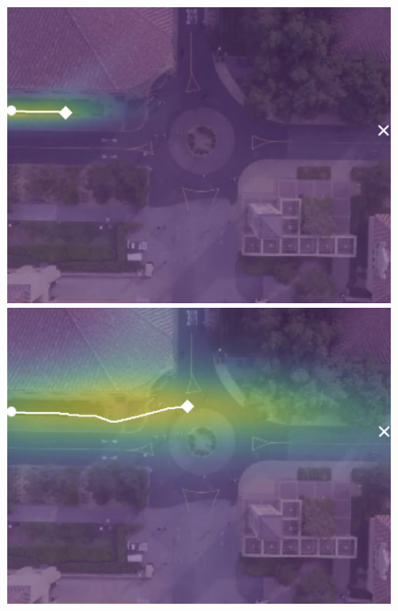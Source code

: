\documentclass[letterpaper,10pt,conference]{ieeeconf}
\begin{document}
\begin{figure}
	\centering
	\begin{minipage}[c]{0.5cm}
	\end{minipage}
	\begin{minipage}[c]{0.3\linewidth}
		\includegraphics[width=\linewidth]{./figures/comparison/ours_death_1_2_t=70.jpg}
	\end{minipage}
	\begin{minipage}[c]{0.3\linewidth}
		\includegraphics[width=\linewidth]{./figures/comparison/ours_death_1_2_t=250.jpg}
	\end{minipage}
	\begin{minipage}[c]{0.3\linewidth}

\end{minipage}
\end{figure}
\end{document}

